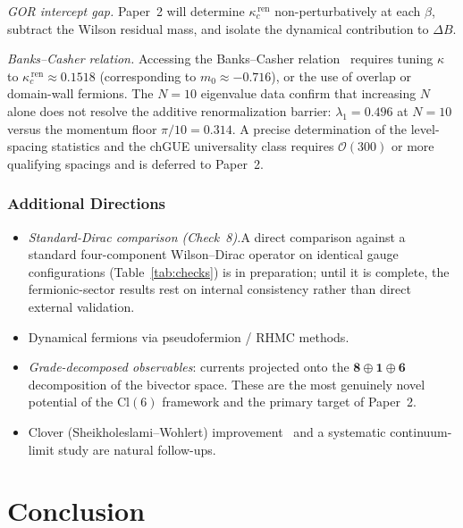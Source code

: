 \documentclass[12pt]{article}
\newcommand{\cl}{\mathrm{Cl}}          %
\begin{document}
\textit{GOR intercept gap.}\enspace
Paper~2 will determine $\kappa_c^{\,\mathrm{ren}}$ non-perturbatively
at each $\beta$, subtract the Wilson residual mass, and isolate the
dynamical contribution to $\Delta B$.

\textit{Banks--Casher relation.}\enspace
Accessing the Banks--Casher
relation~\cite{Banks1980} requires tuning $\kappa$ to
$\kappa_c^{\,\mathrm{ren}}\approx0.1518$ (corresponding to
$m_0\approx-0.716$), or the use of overlap or domain-wall fermions.
The $N=10$ eigenvalue data confirm that increasing $N$ alone does not
resolve the additive renormalization barrier: $\lambda_1=0.496$ at
$N=10$ versus the momentum floor $\pi/10=0.314$.  A precise
determination of the level-spacing statistics and the chGUE
universality class requires $\mathcal{O}(300)$ or more qualifying
spacings and is deferred to Paper~2.

\subsubsection{Additional Directions}
\label{sec:additional}

\begin{itemize}
  \item \textit{Standard-Dirac comparison (Check~8).}\enspace A direct
        comparison against a standard four-component Wilson--Dirac
        operator on identical gauge configurations
        (Table~\ref{tab:checks}) is in preparation; until it is complete,
        the fermionic-sector results rest on internal consistency rather
        than direct external validation.
  \item Dynamical fermions via pseudofermion / RHMC methods.
  \item \textit{Grade-decomposed observables}: currents projected onto
        the $\mathbf{8}\oplus\mathbf{1}\oplus\mathbf{6}$ decomposition
        of the bivector space.  These are the most genuinely novel
        potential of the $\cl(6)$ framework and the primary target of
        Paper~2.
  \item Clover (Sheikholeslami--Wohlert) improvement~\cite{Sheikholeslami1985}
        and a systematic continuum-limit study are natural follow-ups.
\end{itemize}

\section{Conclusion}
\label{sec:conclusion}
\end{document}
